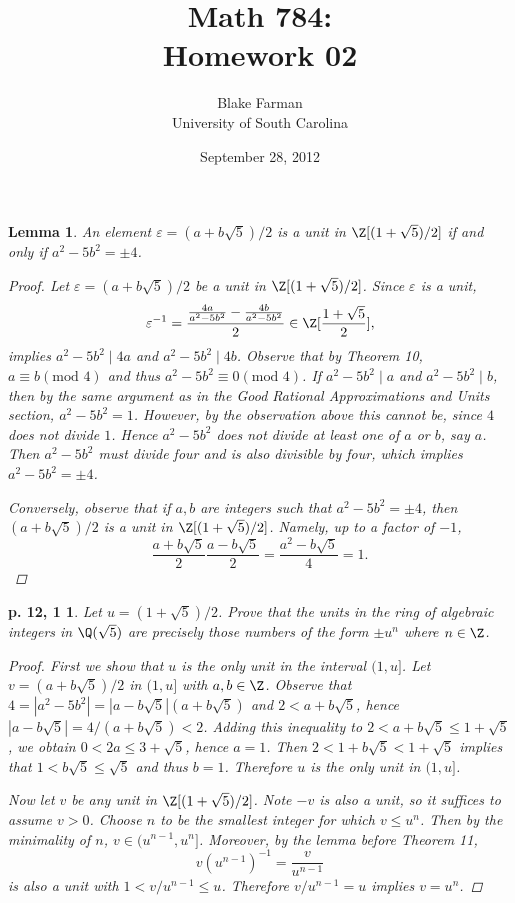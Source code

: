 \documentclass[10pt]{amsart}
\author{Blake Farman\\University of South Carolina}
\title{Math 784:\\Homework 02}
\date{September 28, 2012}
\newcommand{\abs}[1]{\left| #1 \right|}
\begin{document}
\maketitle

\newtheorem*{ex1}{p. 12, 1}
\newtheorem*{ex2}{p. 30, 2}
\newtheorem*{ex3}{p. 34, 1}
\newtheorem{lem}{Lemma}

\begin{lem}
  An element $\varepsilon = (a + b\sqrt{5})/2$ is a unit in $\Z[(1 + \sqrt{5})/2]$ if and only if $a^2 - 5b^2 = \pm 4$.
  \begin{proof}
    Let $\varepsilon = (a + b\sqrt{5})/2$ be a unit in $\Z[(1 + \sqrt{5})/2]$.
    Since $\varepsilon$ is a unit, $$\varepsilon^{-1} = \frac{\frac{4a}{a^2 - 5b^2} - \frac{4b}{a^2 - 5b^2}}{2} \in \Z[\frac{1 + \sqrt{5}}{2}],$$
    implies $a^2 - 5b^2 \mid 4a$ and $a^2 - 5b^2 \mid 4b$.
    Observe that by Theorem 10, $a \equiv b (\text{mod } 4)$ and thus $a^2 - 5b^2 \equiv 0 (\text{mod } 4)$.
    If $a^2 - 5b^2 \mid a$ and $a^2 - 5b^2 \mid b$, then by the same argument as in the Good Rational Approximations and Units section, $a^2 - 5b^2 = 1$.
    However, by the observation above this cannot be, since $4$ does not divide $1$.
    Hence $a^2 - 5b^2$ does not divide at least one of $a$ or $b$, say $a$.
    Then $a^2 - 5b^2$ must divide four and is also divisible by four, which implies $a^2 - 5b^2 = \pm 4$. 
    
    Conversely, observe that if $a,b$ are integers such that $a^2 - 5b^2 = \pm 4$, then $(a + b\sqrt{5})/2$ is a unit in $\Z[(1 + \sqrt{5})/2]$.
    Namely, up to a factor of $-1$, $$\frac{a + b\sqrt{5}}{2}\frac{a - b\sqrt{5}}{2} = \frac{a^2 - b\sqrt{5}}{4} = 1.$$
  \end{proof}
\end{lem}
\begin{ex1}
  Let $u = (1 + \sqrt{5})/2$.
  Prove that the units in the ring of algebraic integers in $\Q(\sqrt{5})$ are precisely those numbers of the form $\pm u^n$ where $n \in \Z$. 
  \begin{proof}
    First we show that $u$ is the only unit in the interval $(1,u]$.
      Let $v = (a+b\sqrt{5})/2$ in $(1,u]$ with $a,b \in \Z$.  
        Observe that $4 = \abs{a^2 - 5b^2} = \abs{a - b\sqrt{5}}(a + b\sqrt{5})$ and $2 < a + b\sqrt{5}$, hence $\abs{a - b\sqrt{5}} = 4/(a + b\sqrt{5}) < 2$.
        Adding this inequality to $2 < a + b\sqrt{5} \leq 1 + \sqrt{5}$, we obtain $0 < 2a \leq 3 + \sqrt{5}$, hence $a = 1$.
        Then $2 < 1 + b\sqrt{5} < 1 + \sqrt{5}$ implies that $1 < b\sqrt{5} \leq \sqrt{5}$ and thus $b = 1$.
        Therefore $u$ is the only unit in $(1,u]$.
          
          Now let $v$ be any unit in $\Z[(1 + \sqrt{5})/2]$.
          Note $-v$ is also a unit, so it suffices to assume $v > 0$.
          Choose $n$ to be the smallest integer for which $v \leq u^n$.
          Then by the minimality of $n$, $v \in (u^{n-1}, u^n]$.
          Moreover, by the lemma before Theorem 11,
          $$v(u^{n-1})^{-1} = \frac{v}{u^{n-1}}$$
          is also a unit with $1 < v/u^{n-1} \leq u$.
          Therefore $v/u^{n-1} = u$ implies $v = u^n$.
  \end{proof}
\end{ex1}
\end{document}
